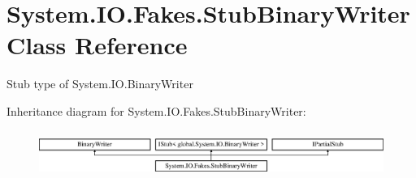 \hypertarget{class_system_1_1_i_o_1_1_fakes_1_1_stub_binary_writer}{\section{System.\-I\-O.\-Fakes.\-Stub\-Binary\-Writer Class Reference}
\label{class_system_1_1_i_o_1_1_fakes_1_1_stub_binary_writer}
}


Stub type of System.\-I\-O.\-Binary\-Writer 


Inheritance diagram for System.\-I\-O.\-Fakes.\-Stub\-Binary\-Writer\-:\begin{figure}[H]
\begin{center}
\leavevmode
\includegraphics[height=1.542700cm]{class_system_1_1_i_o_1_1_fakes_1_1_stub_binary_writer}
\end{center}
\end{figure}

